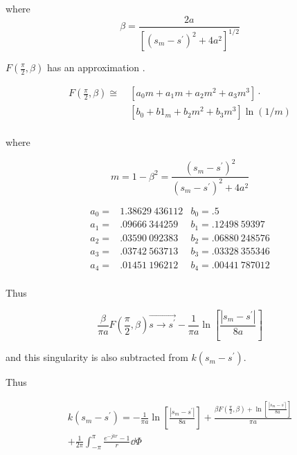 \documentclass[12pt]{article}
\begin{document}
\noindent where
\[ \beta=\frac{2a}{\left[(s_m-s^\prime)^2+4a^2\right]^{1/2}}
\]

\noindent $F(\frac{\pi}{2},\beta)$ has an approximation \cite{r6}.

\begin{equation}
\begin{aligned}
F\left(\frac{\pi}{2}, \beta\right) \cong\
& [a_0m + a_1m + a_2m^2 + a_3m^3] \cdot     \\
& [b_0 + b1_m + b_2m^2 + b_3m^3]\ln(1/m)    \\
\end{aligned}
\label{eq17}
\end{equation}

where

\[
m = 1 - \beta^2 = \frac{(s_m - s^\prime)^2}{(s_m - s^\prime)^2 + 4a^2}
\]

\[
\begin{array}{lrl}
a_0 = & 1.38629\ 436112 & b_0 = .5            \\
a_1 = &  .09666\ 344259 & b_1 = .12498\ 59397  \\
a_2 = &  .03590\ 092383 & b_2 = .06880\ 248576 \\
a_3 = &  .03742\ 563713 & b_3 = .03328\ 355346 \\
a_4 = &  .01451\ 196212 & b_4 = .00441\ 787012 \\
\end{array}
\]

Thus

\begin{equation}
\frac{\beta}{\pi a}F\left(\frac{\pi}{2},\beta\right)
\overrightarrow{s\rightarrow s^\prime}
-\frac{1}{\pi a}\ln\left[\frac{|s_m - s^\prime|}{8a}\right]
\label{eq18}
\end{equation}

and this singularity is also subtracted from $k(s_m-s^\prime)$.

\clearpage
Thus

\begin{equation}
\begin{gathered}
k(s_m - s^\prime) = -\frac{1}{\pi a}\ln \left[\frac{|s_m - s^\prime|}{8a}\right]
+\frac{\beta F(\frac{\pi}{2}, \beta)
      + \ln\left[\frac{|s_m - s^\prime|}{8a}\right]}{\pi a}  \\
+ \frac{1}{2\pi}\int_{-\pi}^\pi\frac{e^{-jkr}-1}{r}\dd{\Phi} \\
\end{gathered}
\label{eq19}
\end{equation}
\end{document}
